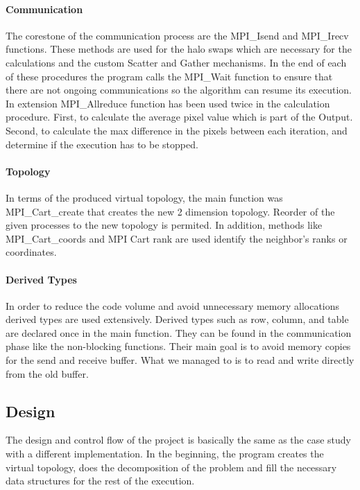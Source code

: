 \documentclass[12pt,a4paper]{article}
\begin{document}
        \paragraph{Communication}
            The corestone of the communication process are the MPI\_Isend and MPI\_Irecv functions. These methods are used for the halo swaps which are necessary for the calculations and the custom Scatter and Gather mechanisms. In the end of each of these procedures the program calls the MPI\_Wait function to ensure that there are not ongoing communications so the algorithm can resume its execution. In extension MPI\_Allreduce function has been used twice in the calculation procedure. First, to calculate the average pixel value which is part of the Output. Second, to calculate the max difference in the pixels between each iteration, and determine if the execution has to be stopped.

        \paragraph{Topology}
            In terms of the produced virtual topology, the main function was MPI\_Cart\_create that creates the new 2 dimension topology. Reorder of the given processes to the new topology is permited. In addition, methods like MPI\_Cart\_coords and MPI Cart rank are used identify the neighbor's ranks or coordinates.

        \paragraph{Derived Types}
            In order to reduce the code volume and avoid unnecessary memory allocations derived types are used extensively. Derived types such as row, column, and table are declared once in the main function. They can be found in the communication phase like the non-blocking functions. Their main goal is to avoid memory copies for the send and receive buffer. What we managed to is to read and write directly from the old buffer.

    \subsection{Design}
        The design and control flow of the project is basically the same as the case study with a different implementation. In the beginning, the program creates the virtual topology, does the decomposition of the problem and fill the necessary data structures for the rest of the execution. 
\end{document}
